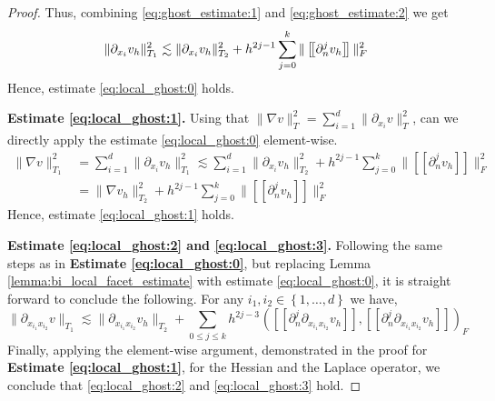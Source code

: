 \documentclass[11pt]{article}
\theoremstyle{remark}
\newcommand{\jump}[1]{\left[\!\left[ #1 \right]\!\right]}
\renewcommand{\le}{\leqslant}
\numberwithin{equation}{section}
\begin{document}
\begin{proof}
Thus, combining \eqref{eq:ghost_estimate:1} and \eqref{eq:ghost_estimate:2} we get
\begin{equation}
    \| \partial _{x_{i}} v_{h} \|_{  T_{1}}^{2  }  \lesssim \| \partial _{x_{i}} v_{h} \|_{ T_{2} }^{  2} + h^{2j-1}\sum_{j=0}^{k} \| \jump{ \partial _{n}^{j} v_{h} }   \|_{F  }^{2  } \\
\end{equation}
        Hence, estimate \eqref{eq:local_ghost:0} holds.

        \textbf{Estimate \eqref{eq:local_ghost:1}.} Using that $\| \nabla  v \|_{T_{}  }^{ 2 } =  \sum_{i=1}^{d} \|  \partial _{x_{i}} v  \|_{T_{}  }^{ 2 }$, can we directly apply the estimate \eqref{eq:local_ghost:0} element-wise.
        \begin{equation}
            \begin{split}
\| \nabla v \|_{T_{1}  }^{2  } &= \sum_{i=1}^{d} \| \partial _{x_{i}}  v_{h} \|_{ T_{1} }^{  2}  \lesssim  \sum_{i=1}^{d} \| \partial _{x_{i}}  v_{h} \|_{ T_{2} }^{  2} + h^{2j-1}\sum_{j=0}^{k} \| \jump{ \partial _{n}^{j} v_{h} }   \|_{F  }^{2  }  \\
         &  = \| \nabla  v_{h} \|_{ T_{2} }^{  2} + h^{2j-1}\sum_{j=0}^{k} \| \jump{ \partial _{n}^{j} v_{h} }   \|_{F  }^{2  }
            \end{split}
        \end{equation}
        Hence, estimate \eqref{eq:local_ghost:1} holds.


\textbf{Estimate \eqref{eq:local_ghost:2} and \eqref{eq:local_ghost:3}.}
Following the same steps as in \textbf{Estimate \eqref{eq:local_ghost:0}}, but replacing Lemma \ref{lemma:bi_local_facet_estimate} with estimate \eqref{eq:local_ghost:0}, it is straight forward to conclude the following. For any  $i_{1},i_{2} \in
\left\{ 1,\ldots, d \right\}$ we have,
\begin{equation}
    \| \partial _{x_{i_1} x_{i_2}} v \|_{ T_{1} }^{  }  \lesssim \| \partial_{ x_{i_1} x_{i_2} } v_{h} \|_{ T_{2} }^{  } + \sum_{0\le j\le k}  {h^{2j -3}}^{} \left(  \jump{ \partial _{n}^{j} \partial _{x_{i_1} x_{i_2}} v_{h} }, \jump{ \partial ^{j}_{n}
        \partial _{x_{i_1} x_{i_2}} v_{h} } \right)     _{F}
\end{equation}
Finally, applying the element-wise argument, demonstrated in the proof for \textbf{Estimate \eqref{eq:local_ghost:1}}, for the Hessian and the Laplace operator, we conclude that \eqref{eq:local_ghost:2} and \eqref{eq:local_ghost:3} hold.

\end{proof}
\end{document}
